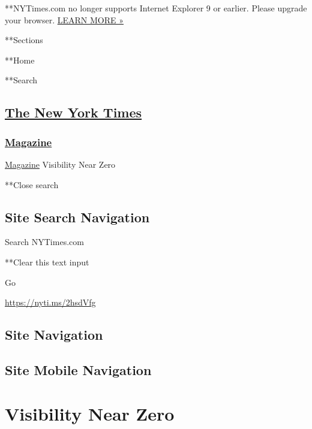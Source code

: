  **NYTimes.com no longer supports Internet Explorer 9 or earlier. Please
upgrade your browser.
\href{http://www.nytimes3xbfgragh.onion/content/help/site/ie9-support.html}{LEARN
MORE »}

**Sections

**Home

**Search

\hypertarget{the-new-york-times}{%
\subsection{\texorpdfstring{\href{http://www.nytimes3xbfgragh.onion/}{The
New York Times}}{The New York Times}}\label{the-new-york-times}}

\hypertarget{-magazine-}{%
\subsubsection{\texorpdfstring{
\href{https://www.nytimes3xbfgragh.onion/section/magazine}{Magazine}
}{ Magazine }}\label{-magazine-}}

 \href{https://www.nytimes3xbfgragh.onion/section/magazine}{Magazine}
\textbar{}Visibility Near Zero

**Close search

\hypertarget{site-search-navigation}{%
\subsection{Site Search Navigation}\label{site-search-navigation}}

Search NYTimes.com

**Clear this text input

Go

\url{https://nyti.ms/2hsdVfg}

\hypertarget{site-navigation}{%
\subsection{Site Navigation}\label{site-navigation}}

\hypertarget{site-mobile-navigation}{%
\subsection{Site Mobile Navigation}\label{site-mobile-navigation}}

\hypertarget{visibility-near-zero}{%
\section{Visibility Near Zero}\label{visibility-near-zero}}

